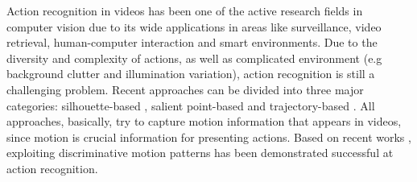 \documentclass[final,3p,times,twocolumn]{elsarticle}
\begin{document}
Action recognition in videos has been one of the active research fields in computer vision \cite{pirsiavash2012detecting, poppe2010survey} due to its wide applications in areas like surveillance, video retrieval, human-computer interaction and smart environments.
Due to the diversity and complexity of actions, as well as complicated environment (e.g background clutter and illumination variation), action recognition is still a challenging problem.
Recent approaches can be divided into three major categories: silhouette-based \cite{blank2005actions, ke2007event, vitaladevuni2008action, yilmaz2005actions}, salient point-based \cite{laptev2005space, dollar2005behavior, laptev2008learning, bregonzio2009recognising, klaser2008aspatiotemporal, willems2008efficient} and trajectory-based \cite{matikainen2009trajectons, messing2009activity, sun2009hierarchical}.
All approaches, basically, try to capture motion information that appears in videos, since motion is crucial information for presenting actions.
Based on recent works \cite{phan2014multimedia, oneata2012axes, natarajan2012bbn}, exploiting discriminative motion patterns has been demonstrated successful at action recognition.
\end{document}

